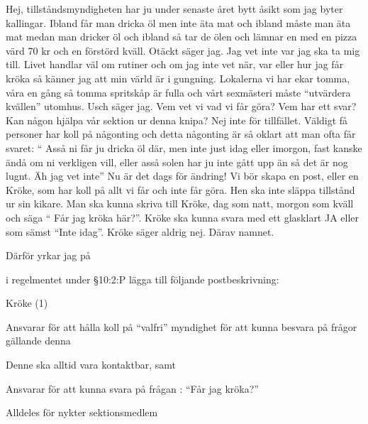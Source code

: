 \documentclass[../_main/handlingar.tex]{subfiles}
\begin{document}

Hej, tillståndsmyndigheten har ju under senaste året bytt åsikt som jag byter kallingar. Ibland
får man dricka öl men inte äta mat och ibland måste man äta mat medan man dricker öl och
ibland så tar de ölen och lämnar en med en pizza värd 70 kr och en förstörd kväll. Otäckt
säger jag. Jag vet inte var jag ska ta mig till. Livet handlar väl om rutiner och om jag inte vet
när, var eller hur jag får kröka så känner jag att min värld är i gungning. Lokalerna vi har ekar
tomma, våra en gång så tomma spritskåp är fulla och vårt sexmästeri måste “utvärdera
kvällen” utomhus. Usch säger jag. Vem vet vi vad vi får göra? Vem har ett svar? Kan någon
hjälpa vår sektion ur denna knipa? Nej inte för tillfället. Väldigt få personer har koll på
någonting och detta någonting är så oklart att man ofta får svaret: “ Asså ni får ju dricka öl
där, men inte just idag eller imorgon, fast kanske ändå om ni verkligen vill, eller asså solen
har ju inte gått upp än så det är nog lugnt. Äh jag vet inte” Nu är det dags för ändring! Vi bör
skapa en post, eller en Kröke, som har koll på allt vi får och inte får göra. Hen ska inte
släppa tillstånd ur sin kikare. Man ska kunna skriva till Kröke, dag som natt, morgon som
kväll och säga “ Får jag kröka här?”. Kröke ska kunna svara med ett glasklart JA eller som
sämst “Inte idag”. Kröke säger aldrig nej. Därav namnet.


Därför yrkar jag på
\begin{attsatser}

    \att i regelmentet under \S10:2:P lägga till följande postbeskrivning: \par
    \begin{emptylist}
        \item Kröke (1)
        \begin{dashlist}
            \item Ansvarar för att hålla koll på “valfri” myndighet för att kunna besvara på frågor gällande denna
            \item Denne ska alltid vara kontaktbar, samt
            \item Ansvarar för att kunna svara på frågan : “Får jag kröka?”
        \end{dashlist}
    \end{emptylist}
\end{attsatser}


\begin{signatures}{1}
    \isekt
    \signature{Anonym}{Alldeles för nykter sektionsmedlem}
\end{signatures}
\end{document}
